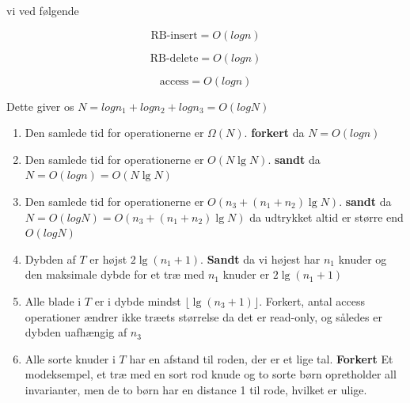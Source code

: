 \documentclass{article}
\theoremstyle{definition}
\begin{document}
vi ved følgende

\[
\text{RB-insert} = O(log n)
\]

\[
\text{RB-delete} = O(log n)
\]

\[
\text{access} = O(log n)
\]

Dette giver os $N = log n_1 + log n_2 + log n_3 = O(log N) $

\begin{enumerate}
\item Den samlede tid for operationerne er $\Omega(N)$. \textbf{forkert} da $N=O(log n)$
\item Den samlede tid for operationerne er $O(N \lg N)$. \textbf{sandt} da $N=O(log n)= O(N \lg N)$
\item Den samlede tid for operationerne er $O(n_3 + (n_1 + n_2) \lg N)$. \textbf{sandt} da $N=O(log N)=O(n_3 + (n_1 + n_2) \lg N)$ da udtrykket altid er større end $O(log N)$
\item Dybden af $T$ er højst $2 \lg(n_1 + 1)$.  \textbf{Sandt} da vi højest har $n_1$ knuder og den maksimale dybde for et træ med $n_1$ knuder er $2 \lg(n_1 + 1)$
\item Alle blade i $T$ er i dybde mindst $\lfloor\lg(n_3 + 1)\rfloor$. Forkert, antal access operationer ændrer ikke træets størrelse da det er read-only, og således er dybden uafhængig af $n_3$
\item Alle sorte knuder i $T$ har en afstand til roden, der er et lige tal.  \textbf{Forkert} Et modeksempel, et træ med en sort rod knude og to sorte børn opretholder all invarianter, men de to børn har en distance 1 til rode, hvilket er ulige.
\end{enumerate}
\end{document}
